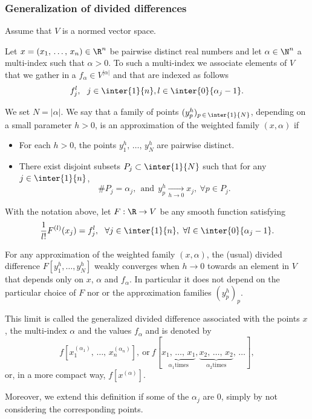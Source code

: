 \subsubsection{Generalization of divided differences} \label{Subsec:Annexe_DD_generalisees}

Assume that $V$ is a normed vector space.

Let $x=(x_1,\,\dotsc,\,x_n)\in \R^n$ be pairwise distinct real numbers and let $\alpha\in \N^n$ a multi-index such that $\alpha>0$. To such a multi-index we associate elements of $V$ that we gather in a $f_\alpha\in V^{|\alpha|}$ and that are indexed as follows
\[
f_j^l, \ \ j\in \inter{1}{n}, l\in \inter{0}{\alpha_j-1}.
\]



\begin{defi}\label{Def:approximation_weighted_family}
We set $N=|\alpha|$. We say that a family of points $(y_p^h)_{p\,\in\, \inter{1}{N}}$, depending on a small parameter $h>0$, is an approximation of the weighted family $(x,\alpha)$ if
\begin{itemize}
\item For each $h>0$, the points $y_1^h,\,\dotsc,\,y_N^h$ are pairwise distinct.
\item There exist disjoint subsets $P_j\subset \inter{1}{N}$ such that for any $j\in \inter{1}{n}$,
\[
\# P_j = \alpha_j, \ \ \text{and} \ \ y_p^h\xrightarrow[h\to 0]{} x_j,\ \forall p\in P_j.
\]
\end{itemize}
\end{defi}

\begin{prop}\label{Prop:generalised_div_diff}
With the notation above, let $F:\R\to V$ be any smooth function satisfying
\begin{equation}\label{proprietes_F}
\frac{1}{l!} F^{(l)}(x_j) = f_j^l, \ \ \forall j\in \inter{1}{n}, \ \forall l\in \inter{0}{\alpha_j-1}.
\end{equation}

For any approximation of the weighted family $(x,\alpha)$, the (usual) divided difference $F[y_1^h,\dotsc,y_N^h]$ weakly converges when $h\to 0$ towards an element in $V$ that depends only on $x$, $\alpha$ and $f_\alpha$. In particular it does not depend on the particular choice of $F$ nor or the approximation families $(y_p^h)_p$.

This limit is called the generalized divided difference associated with the points $x$, the multi-index $\alpha$ and the values $f_\alpha$ and is denoted by
\[
f[x_1^{(\alpha_1)},\,\dotsc,\,x_n^{(\alpha_n)}], \ \text{or} \ f[\underbrace{x_1,\,\dotsc,\,x_1}_{\alpha_1 \text{times}},\underbrace{x_2,\,\dotsc,\,x_2}_{\alpha_2 \text{times}},\,\dotsc],
\]
or, in a more compact way, $f[x^{(\alpha)}]$.

Moreover, we extend this definition if some of the $\alpha_j$ are $0$, simply by not considering the corresponding points.
\end{prop}


